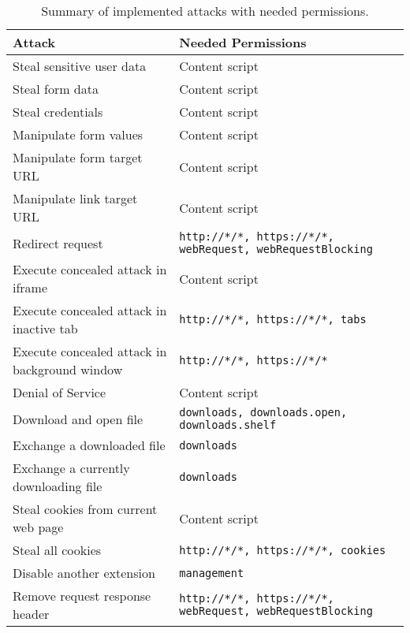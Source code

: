	
	\begin{table}
		\begin{tabular}{|l|l|} \hline 
			\textbf{Attack} & \textbf{Needed Permissions} \\ \hline
			Steal sensitive user data & Content script \\
			Steal form data & Content script \\
			Steal credentials & Content script \\
			\hline
			Manipulate form values & Content script \\
			Manipulate form target URL & Content script \\
			Manipulate link target URL & Content script \\
			Redirect request & \texttt{http://*/*, https://*/*, webRequest, webRequestBlocking} \\
			\hline
			Execute concealed attack in iframe & Content script \\
			Execute concealed attack in inactive tab & \texttt{http://*/*, https://*/*, tabs} \\
			Execute concealed attack in background window & \texttt{http://*/*, https://*/*} \\
			\hline
			Denial of Service & Content script \\
			\hline
			Download and open file & \texttt{downloads, downloads.open, downloads.shelf} \\
			Exchange a downloaded file & \texttt{downloads} \\
			Exchange a currently downloading file & \texttt{downloads} \\
			\hline
			Steal cookies from current web page & Content script \\
			Steal all cookies & \texttt{http://*/*, https://*/*, cookies} \\
			\hline
			Disable another extension & \texttt{management} \\
			\hline
			Remove request response header & \texttt{http://*/*, https://*/*, webRequest, webRequestBlocking} \\
			\hline
		\end{tabular}
		\caption{Summary of implemented attacks with needed permissions.}
	\end{table}